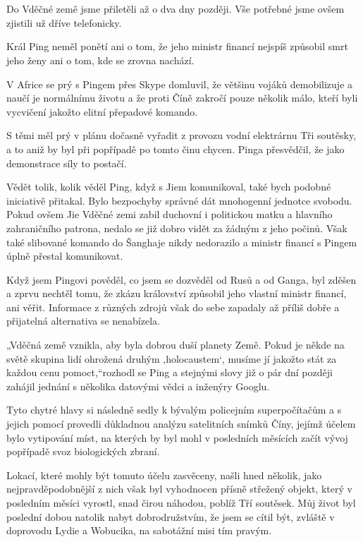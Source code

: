 \chapter{}

Do Vděčné země jsme přiletěli až o dva dny později. Vše potřebné jsme ovšem zjistili už dříve telefonicky.

Král Ping neměl ponětí ani o tom, že jeho ministr financí nejspíš způsobil smrt jeho ženy ani o tom, kde se zrovna nachází. 

V Africe se prý s Pingem přes Skype domluvil, že většinu vojáků demobilizuje a naučí je normálnímu životu a že proti Číně zakročí pouze několik málo, kteří byli vycvičení jakožto elitní přepadové komando. 

S těmi měl prý v plánu dočasně vyřadit z provozu vodní elektrárnu Tři soutěsky, a to aniž by byl při popřípadě po tomto činu chycen. Pinga přesvědčil, že jako demonstrace síly to postačí.

Vědět tolik, kolik věděl Ping, když s Jiem komunikoval, také bych podobné iniciativě přitakal. Bylo bezpochyby správné dát mnohogenní jednotce svobodu. Pokud ovšem Jie Vděčné zemi zabil duchovní i politickou matku a hlavního zahraničního patrona, nedalo se již dobro vidět za žádným z jeho počinů. Však také slibované komando do Šanghaje nikdy nedorazilo a ministr financí s Pingem úplně přestal komunikovat.

Když jsem Pingovi pověděl, co jsem se dozvěděl od Rusů a od Ganga, byl zděšen a zprvu nechtěl tomu, že zkázu království způsobil jeho vlastní ministr financí, ani věřit. Informace z různých zdrojů však do sebe zapadaly až příliš dobře a přijatelná alternativa se nenabízela.

„Vděčná země vznikla, aby byla dobrou duší planety Země. Pokud je někde na světě skupina lidí ohrožená druhým ‚holocaustem‘, musíme jí jakožto stát za každou cenu pomoct,“rozhodl se Ping a stejnými slovy již o pár dní později zahájil jednání s několika datovými vědci a inženýry Googlu.

Tyto chytré hlavy si následně sedly k bývalým policejním superpočítačům a s jejich pomocí provedli důkladnou analýzu satelitních snímků Číny, jejímž účelem bylo vytipování míst, na kterých by byl mohl v posledních měsících začít vývoj popřípadě svoz biologických zbraní.

Lokací, které mohly být tomuto účelu zasvěceny, našli hned několik, jako nejpravděpodobnější z nich však byl vyhodnocen přísně střežený objekt, který v posledním měsíci vyrostl, snad čirou náhodou, poblíž Tří soutěsek. Můj život byl poslední dobou natolik nabyt dobrodružstvím, že jsem se cítil být, zvláště v doprovodu Lydie a Wobucika, na sabotážní misi tím pravým.

